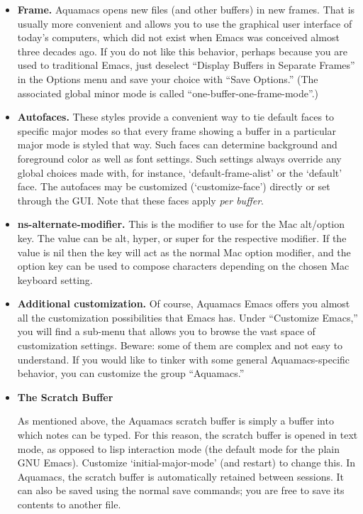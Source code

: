 \documentclass[11pt,letterpaper]{article}
\begin{document}
\begin{itemize} 
\item \textbf{Frame.} Aquamacs opens new files (and other buffers) in new frames. That is usually more convenient and allows you to use the graphical user interface of today's computers, which did not exist when Emacs was conceived almost three decades ago. If you do not like this behavior, perhaps because you are used to traditional Emacs, just deselect ``Display Buffers in Separate Frames'' in the Options menu and save your choice with ``Save Options.'' (The associated global minor mode is called ``one-buffer-one-frame-mode''.)

\item \textbf{Autofaces.} These styles provide a convenient way to tie default faces to specific major modes so that every frame showing a buffer in a particular major mode is styled that way. Such faces can  determine background and foreground color as well as font settings.  Such settings always override any global choices made with, for instance, `default-frame-alist' or the `default' face.   The autofaces may be customized (`customize-face') directly or set through the GUI.  Note that these faces apply {\em per buffer}.

\item \textbf{ns-alternate-modifier.} This is  the modifier to use for the Mac alt/option key.  The value can
be alt, hyper, or super for the respective modifier.  If the value is
nil then the key will act as the normal Mac option modifier, and the option
key can be used to compose characters depending on the chosen Mac keyboard
setting. 

\item \textbf{Additional customization.} Of course, Aquamacs Emacs
  offers you almost all the customization  possibilities that Emacs
  has. Under ``Customize Emacs,'' you will find  a sub-menu that
  allows you to browse the vast space of customization
  settings. Beware: some of them are complex and not easy to
  understand. If you would like to tinker with some general Aquamacs-specific
  behavior, you can customize the group ``Aquamacs.'' 

\item \textbf{The Scratch Buffer}

  As mentioned above, the Aquamacs scratch buffer is simply a buffer into which notes can be typed.  For this reason, the scratch buffer is opened in text mode, as opposed to lisp interaction mode (the default mode for the plain GNU Emacs). Customize `initial-major-mode' (and restart) to change this.  In Aquamacs, the scratch buffer is automatically retained between sessions.  It can also be saved using the normal save commands; you are free to save its contents to another file.


\end{itemize}
\end{document}
